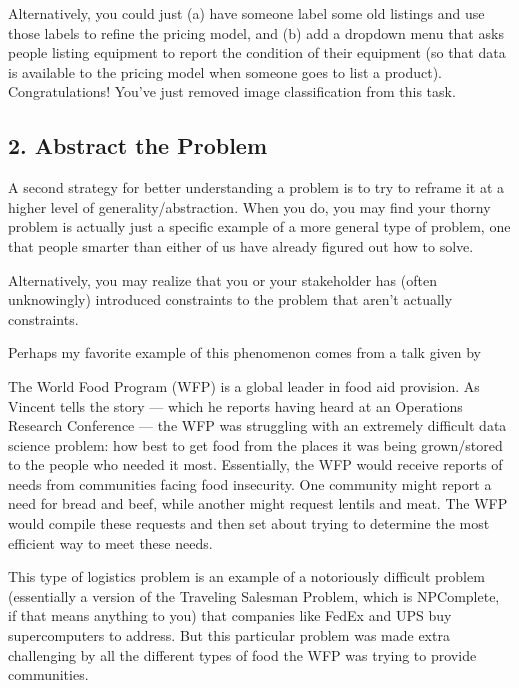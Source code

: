 \documentclass[letterpaper,10pt,english]{jupyterBook}
\begin{document}
\sphinxAtStartPar
Alternatively, you could just (a) have someone label some old listings and use those labels  to refine the pricing model, and (b) add a drop\sphinxhyphen{}down menu that asks people listing equipment to report the condition of their equipment (so that data is available to the pricing model when someone goes to list a product). Congratulations! You’ve just  removed image classification from this task.


\subsection{2. Abstract the Problem}
\label{\detokenize{20_problems_to_questions/10_solving_the_right_problem:abstract-the-problem}}
\sphinxAtStartPar
A second strategy for better understanding a problem is to try to reframe it at a higher level of generality/abstraction. When you do, you may find your thorny problem is actually just a specific example of a more general type of problem, one that people smarter than either of us have already figured out how to solve.

\sphinxAtStartPar
Alternatively, you may realize that you or your stakeholder has (often unknowingly) introduced constraints to the problem that aren’t actually constraints.

\sphinxAtStartPar
Perhaps my favorite example of this phenomenon comes from a talk given by 

\sphinxAtStartPar
The World Food Program (WFP) is a global leader in food aid provision. As Vincent tells the story — which he reports having heard at an Operations Research Conference — the WFP was struggling with an extremely difficult data science problem: how best to get food from the places it was being grown/stored to the people who needed it most. Essentially, the WFP would receive reports of needs from communities facing food insecurity. One community might report a need for bread and beef, while another might request lentils and meat. The WFP would compile these requests and then set about trying to determine the most efficient way to meet these needs.

\sphinxAtStartPar
This type of logistics problem is an example of a notoriously difficult problem (essentially a version of the Traveling Salesman Problem, which is NP\sphinxhyphen{}Complete, if that means anything to you) that companies like FedEx and UPS buy supercomputers to address. But this particular problem was made extra challenging by all the different types of food the WFP was trying to provide communities.
\end{document}
